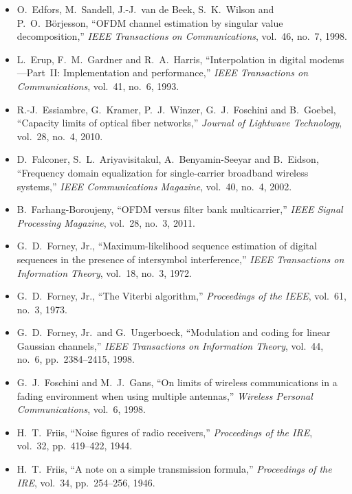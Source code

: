 \begin{itemize}[leftmargin=1.5em,itemindent=-1.5em,itemsep=1.5pt plus 1pt,parsep=0pt,topsep=4pt,label={}]
\item O.~Edfors, M.~Sandell, J.-J.~van de Beek, S.~K.~Wilson and P.~O.~B\"orjesson, ``OFDM channel estimation by singular value decomposition,'' \emph{IEEE Transactions on Communications}, vol.~46, no.~7, 1998.
\item L.~Erup, F.~M.~Gardner and R.~A.~Harris, ``Interpolation in digital modems---Part~II: Implementation and performance,'' \emph{IEEE Transactions on Communications}, vol.~41, no.~6, 1993.
\item R.-J.~Essiambre, G.~Kramer, P.~J.~Winzer, G.~J.~Foschini and B.~Goebel, ``Capacity limits of optical fiber networks,'' \emph{Journal of Lightwave Technology}, vol.~28, no.~4, 2010.
\item D.~Falconer, S.~L.~Ariyavisitakul, A.~Benyamin-Seeyar and B.~Eidson, ``Frequency domain equalization for single-carrier broadband wireless systems,'' \emph{IEEE Communications Magazine}, vol.~40, no.~4, 2002.
\item B.~Farhang-Boroujeny, ``OFDM versus filter bank multicarrier,'' \emph{IEEE Signal Processing Magazine}, vol.~28, no.~3, 2011.
\item G.~D.~Forney, Jr., ``Maximum-likelihood sequence estimation of digital sequences in the presence of intersymbol interference,'' \emph{IEEE Transactions on Information Theory}, vol.~18, no.~3, 1972.
\item G.~D.~Forney, Jr., ``The Viterbi algorithm,'' \emph{Proceedings of the IEEE}, vol.~61, no.~3, 1973.
\item G.~D.~Forney, Jr.\ and G.~Ungerboeck, ``Modulation and coding for linear Gaussian channels,'' \emph{IEEE Transactions on Information Theory}, vol.~44, no.~6, pp.~2384--2415, 1998.
\item G.~J.~Foschini and M.~J.~Gans, ``On limits of wireless communications in a fading environment when using multiple antennas,'' \emph{Wireless Personal Communications}, vol.~6, 1998.
\item H.~T.~Friis, ``Noise figures of radio receivers,'' \emph{Proceedings of the IRE}, vol.~32, pp.~419--422, 1944.
\item H.~T.~Friis, ``A note on a simple transmission formula,'' \emph{Proceedings of the IRE}, vol.~34, pp.~254--256, 1946.

\end{itemize}
